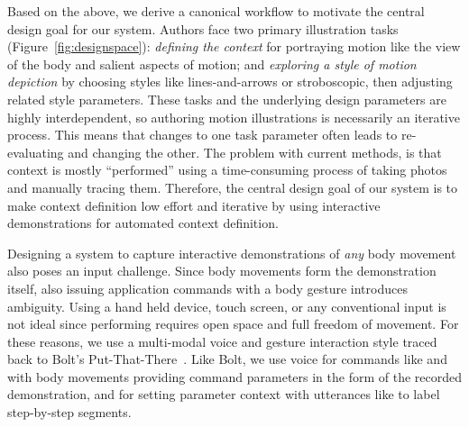 Based on the above, we derive a canonical workflow to motivate the central design goal for our system.
Authors face two primary illustration tasks (Figure~\ref{fig:designspace}):
\textit{defining the context} for portraying motion like the view of the body and salient aspects of motion;
and \textit{exploring a style of motion depiction} by choosing styles like lines-and-arrows or stroboscopic, then adjusting related style parameters.
These tasks and the underlying design parameters are highly interdependent, so authoring motion illustrations is necessarily an iterative process.
This means that changes to one task parameter often leads to re-evaluating and changing the other.
The problem with current methods, is that context is mostly ``performed'' using a time-consuming process of taking photos and manually tracing them.
%
Therefore, the central design goal of our system is to make context definition  low effort and iterative by using interactive demonstrations for automated context definition.





Designing a system to capture interactive demonstrations of \textit{any} body movement also poses an input challenge.
Since  body movements form the demonstration itself, also issuing application commands with a body gesture introduces ambiguity.
Using a hand held device, touch screen, or any conventional input is not ideal since performing requires open space and full freedom of movement.
For these reasons, we use a multi-modal voice and gesture interaction style traced back to Bolt's Put-That-There~\cite{Bolt:1980:PutThatThere}. Like Bolt, we use voice for commands like  and  with body movements providing command parameters in the form of the recorded demonstration, and for setting parameter context with utterances like  to label step-by-step segments.

